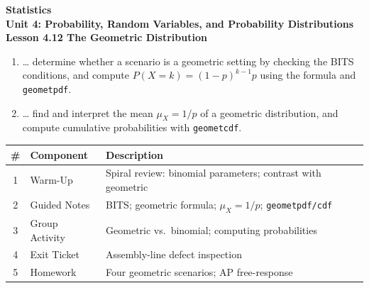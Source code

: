 \documentclass[10pt]{article}
\begin{document}
\vspace{-0.8in}

\begin{center}
  {\color{white}\textbf{\LARGE Statistics}}\\[4pt]
  {\color{skymid}\large\textbf{Unit 4: Probability, Random Variables, and Probability Distributions}}\\[6pt]
  {\color{white}\textbf{\large Lesson 4.12 \quad The Geometric Distribution}}
\end{center}

\vspace{0.22in}
\namedateperiod
\vspace{0.18in}

\begin{learningtargetbox}
\small
\begin{enumerate}[leftmargin=1.5em, itemsep=5pt]
  \item \ldots{} determine whether a scenario is a geometric setting by checking
        the BITS conditions, and compute $P(X = k) = (1-p)^{k-1}p$ using the
        formula and \texttt{geometpdf}.
  \item \ldots{} find and interpret the mean $\mu_X = 1/p$ of a geometric
        distribution, and compute cumulative probabilities with \texttt{geometcdf}.
\end{enumerate}
\end{learningtargetbox}

\vspace{0.14in}

\begin{tocbox}
\small
\renewcommand{\arraystretch}{1.5}
\begin{tabularx}{\linewidth}{@{} c l X @{}}
\rowcolor{sky}
\textbf{\#} & \textbf{Component} & \textbf{Description} \\
\midrule
1 & Warm-Up        & Spiral review: binomial parameters; contrast with geometric \\
2 & Guided Notes   & BITS; geometric formula; $\mu_X = 1/p$; \texttt{geometpdf/cdf} \\
3 & Group Activity & Geometric vs.\ binomial; computing probabilities \\
4 & Exit Ticket    & Assembly-line defect inspection \\
5 & Homework       & Four geometric scenarios; AP free-response \\
\end{tabularx}
\end{tocbox}
\end{document}
